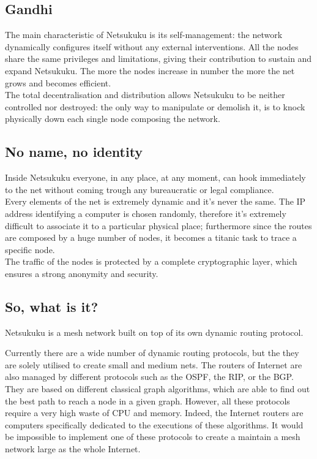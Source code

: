\documentclass[a4paper]{article}
\begin{document}
\subsection{Gandhi}

The main characteristic of Netsukuku is its self-management: the network
dynamically configures itself without any external interventions.
All the nodes share the same privileges and limitations, giving their
contribution to sustain and expand Netsukuku.
The more the nodes increase in number the more the net grows and becomes
efficient.\\

The total decentralisation and distribution allows Netsukuku to be
neither controlled nor destroyed: the only way to manipulate or demolish
it, is to knock physically down each single node composing the network.

\subsection{No name, no identity}

Inside Netsukuku everyone, in any place, at any moment, can hook immediately
to the net without coming trough any bureaucratic or legal compliance.\\

Every elements of the net is extremely dynamic and it's never the same.
The IP address identifying a computer is chosen randomly, therefore it's
extremely difficult to associate it to a particular physical place; furthermore
since the routes are composed by a huge number of nodes, it becomes a titanic
task to trace a specific node.\\
The traffic of the nodes is protected by a complete cryptographic
layer\cite{carciofo}, which ensures a strong anonymity and security.

\subsection{So, what is it?}

Netsukuku is a mesh network built on top of its own dynamic routing protocol.

Currently there are a wide number of dynamic routing protocols, but the they
are solely utilised to create small and medium nets.
The routers of Internet are also managed by different protocols such as the
OSPF, the RIP, or the BGP. They are based on different classical graph
algorithms, which are able to find out the best path to reach a node in a
given graph. However, all these protocols require a very high waste of CPU and
memory. Indeed, the Internet routers are computers specifically dedicated to
the executions of these algorithms. It would be impossible to implement one of
these protocols to create a maintain a mesh network large as the whole
Internet.
\end{document}
